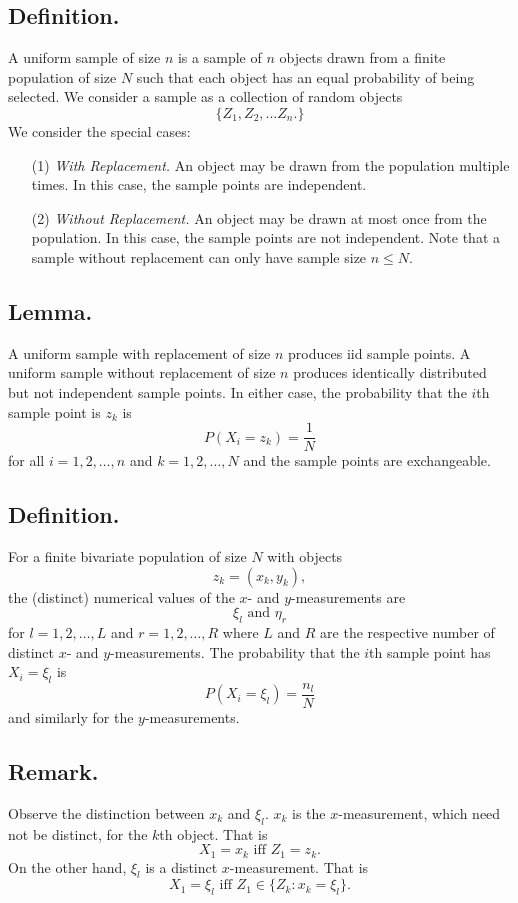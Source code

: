 \documentclass[titlepage]{article}
\begin{document}
\subsection{Definition.} A uniform sample of size $n$ is a sample of $n$ objects drawn from a finite population of size $N$ such that each object has an equal probability of being selected. We consider a sample as a collection of random objects 
$$\{Z_{1}, Z_{2}, \ldots Z_{n}.\}$$
We consider the special cases:
\begin{enumerate}
\item[(1)] \textit{With Replacement.} An object may be drawn from the population multiple times. In this case, the sample points are independent.
\item[(2)] \textit{Without Replacement.} An object may be drawn at most once from the population. In this case, the sample points are not independent. Note that a sample without replacement can only have sample size $n \leq N$.
\end{enumerate}

\subsection{Lemma.} A uniform sample with replacement of size $n$ produces iid sample points. A uniform sample without replacement of size $n$ produces identically distributed but not independent sample points. In either case, the probability that the $i$th sample point is $z_{k}$ is
$$P(X_{i} = z_{k}) = \frac{1}{N}$$
for all $i = 1, 2, \ldots, n$ and $k = 1, 2, \ldots, N$ and the sample points are exchangeable.

\subsection{Definition.} For a finite bivariate population of size $N$ with objects 
$$z_{k} = (x_{k}, y_{k}),$$
the (distinct) numerical values of the $x$- and $y$-measurements are 
$$\xi_{l} \text{ and } \eta_{r}$$
for $l = 1, 2, \ldots, L$ and $r = 1, 2, \ldots, R$ where $L$ and $R$ are the respective number of distinct $x$- and $y$-measurements. The probability that the $i$th sample point has $X_{i} = \xi_{l}$ is
$$P(X_{i} = \xi_{l}) = \frac{n_{l}}{N}$$
and similarly for the $y$-measurements.

\subsection{Remark.} Observe the distinction between $x_{k}$ and $\xi_{l}$. $x_{k}$ is the $x$-measurement, which need not be distinct, for the $k$th object. That is 
$$X_{1} = x_{k} \text{ iff } Z_{1} = z_{k}.$$
On the other hand, $\xi_{l}$ is a distinct $x$-measurement. That is 
$$X_{1} = \xi_{l} \text{ iff } Z_{1} \in \{Z_{k} : x_{k} = \xi_{l}\}.$$
\end{document}
